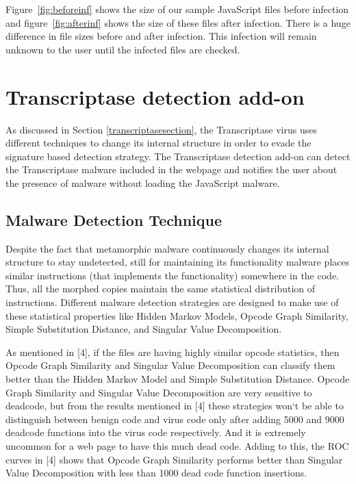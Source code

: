 Figure~\ref{fig:beforeinf} shows the size of our sample JavaScript files before infection and figure~\ref{fig:afterinf} shows the size of these files after infection. There is a huge difference in file sizes before and after infection. This infection will remain unknown to the user until the infected files are checked.

\section{Transcriptase detection add-on} 

As discussed in Section \ref{transcriptasesection}, the Transcriptase virus uses different techniques to change its internal structure in order to evade the signature based detection strategy. The Transcriptase detection add-on can detect the Transcriptase malware included in the webpage and notifies the user about the presence of malware without loading the JavaScript malware.

\subsection{Malware Detection Technique} 
Despite the fact that metamorphic malware continuously changes its internal structure to stay undetected, still for maintaining its functionality malware places similar instructions (that implements the functionality) somewhere in the code. Thus, all the morphed copies maintain the same statistical distribution of instructions. Different malware detection strategies are designed to make use of these statistical properties like Hidden Markov Models, Opcode Graph Similarity, Simple Substitution Distance, and Singular Value Decomposition.

As mentioned in [4], if the files are having highly similar opcode statistics, then Opcode Graph Similarity and Singular Value Decomposition can classify them better than the Hidden Markov Model and Simple Substitution Distance. Opcode Graph Similarity and Singular Value Decomposition are very sensitive to deadcode, but from the results mentioned in [4] these strategies won`t be able to distinguish between benign code and virus code only after adding 5000 and 9000 deadcode functions into the virus code respectively. And it is extremely uncommon for a web page to have this much dead code. Adding to this, the ROC curves in [4] shows that Opcode Graph Similarity performs better than Singular Value Decomposition with less than 1000 dead code function insertions.

